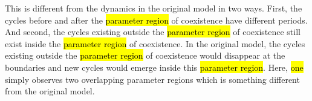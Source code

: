 This is different from the dynamics in the original model in two ways.
First, the cycles before and after the \hl{parameter region} of coexistence have different periods.
And second, the cycles existing outside the \hl{parameter region} of coexistence still exist inside the \hl{parameter region} of coexistence.
In the original model, the cycles existing outside the \hl{parameter region} of coexistence would disappear at the boundaries and new cycles would emerge inside this \hl{parameter region}.
Here, \hl{one} simply observes two overlapping parameter regions which is something different from the original model.
